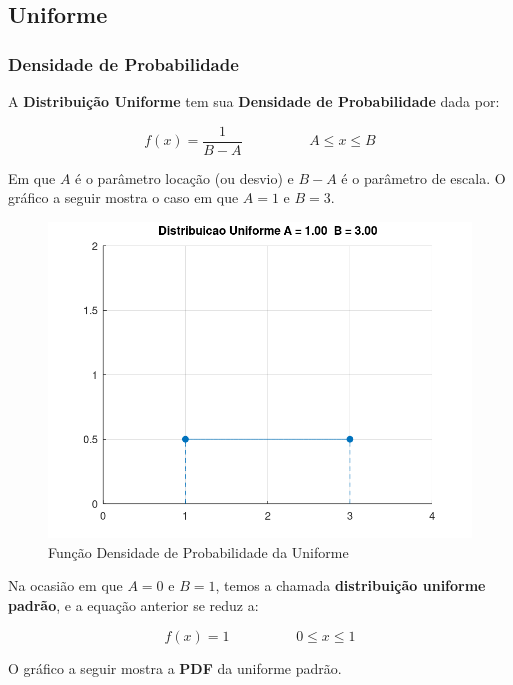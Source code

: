 \documentclass[
]{book}
\begin{document}
\hypertarget{uniforme}{%
\subsection{Uniforme}\label{uniforme}}

\hypertarget{densidade-de-probabilidade-1}{%
\subsubsection*{Densidade de Probabilidade}\label{densidade-de-probabilidade-1}}

A \textbf{Distribuição Uniforme} tem sua \textbf{Densidade de Probabilidade} dada por:

\begin{equation}
f(x) = \frac{1}{B-A} \hspace{2cm} A \leq x \leq B 
\end{equation}

Em que \(A\) é o parâmetro locação (ou desvio) e \(B-A\) é o parâmetro de escala. O gráfico a seguir mostra o caso em que \(A = 1\) e \(B = 3\).

\begin{figure}

{\centering \includegraphics[width=0.5\linewidth]{images/uniformepdf} 

}

\caption{Função Densidade de Probabilidade da Uniforme}\label{fig:unnamed-chunk-4}
\end{figure}

Na ocasião em que \(A = 0\) e \(B = 1\), temos a chamada \textbf{distribuição uniforme padrão}, e a equação anterior se reduz a:

\begin{equation}
f(x) = 1 \hspace{2cm} 0 \leq x \leq 1
\end{equation}

O gráfico a seguir mostra a \textbf{PDF} da uniforme padrão.
\end{document}
